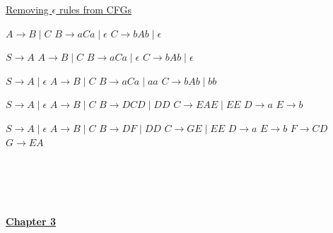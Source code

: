 \documentclass[9pt]{article}
\begin{document}
\uline{Removing $\epsilon$ rules from CFGs}\newline
\begin{minipage}[t]{.20\textwidth}
$A\rightarrow B\mid C$\newline
$B\rightarrow aCa\mid \epsilon$\newline
$C\rightarrow bAb\mid \epsilon$
\end{minipage}%
\begin{minipage}[t]{.20\textwidth}
$S\rightarrow A$\newline
$A\rightarrow B\mid C$\newline
$B\rightarrow aCa\mid \epsilon$\newline
$C\rightarrow bAb\mid \epsilon$
\end{minipage}%
\begin{minipage}[t]{.20\textwidth}
$S\rightarrow A \mid \epsilon$\newline
$A\rightarrow B\mid C$\newline
$B\rightarrow aCa\mid aa$\newline
$C\rightarrow bAb\mid bb$
\end{minipage}%
\begin{minipage}[t]{.20\textwidth}
$S\rightarrow A \mid \epsilon$\newline
$A\rightarrow B\mid C$\newline
$B\rightarrow DCD\mid DD$\newline
$C\rightarrow EAE\mid EE$\newline
$D\rightarrow a$\newline
$E\rightarrow b$
\end{minipage}%
\begin{minipage}[t]{.20\textwidth}
$S\rightarrow A \mid \epsilon$\newline
$A\rightarrow B\mid C$\newline
$B\rightarrow DF\mid DD$\newline
$C\rightarrow GE\mid EE$\newline
$D\rightarrow a$\newline
$E\rightarrow b$\newline
$F\rightarrow CD$\newline
$G\rightarrow EA$
\end{minipage}\\\\\\\\
\uline{\textbf{Chapter 3}}\newline
\end{document}
